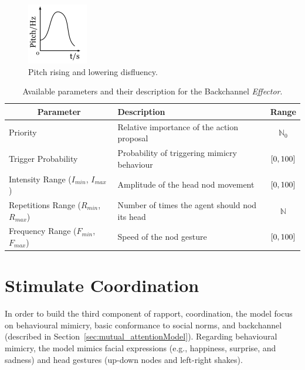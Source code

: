 \begin{figure}[H]
  \hspace{3mm}
  \begin{minipage}[b]{0.5\linewidth}
    \centering
    \includegraphics[width=.35\linewidth]{images/PitchRisingLowering.png} 
    \caption{Pitch rising and lowering disfluency.} 
    \label{fig:risingLowering}
    \vspace{4ex}
  \end{minipage} 
\end{figure}

\begin{table}[H]
	\centering
	\begin{tabular}{|l|l|c|}
	\hline
	\multicolumn{1}{|c|}{\textbf{Parameter}} & \textbf{Description} & \textbf{Range} \\ \hline
		Priority & Relative importance of the action proposal & $\mathbb{N}_0$ \\ \hline
		Trigger Probability & Probability of triggering mimicry behaviour & $\interval{0}{100}$ \\ \hline
		Intensity Range ($I_{min}$, $I_{max}$) & Amplitude of the head nod movement & $\interval{0}{100}$ \\ \hline
		Repetitions Range ($R_{min}$, $R_{max}$) & Number of times the agent should nod its head & $\mathbb{N}$\\ \hline
		Frequency Range ($F_{min}$, $F_{max}$) & Speed of the nod gesture & $\interval{0}{100}$ \\ \hline				
	\end{tabular}
	\caption{Available parameters and their description for the Backchannel \textit{Effector}.}
	\label{table:backchannel}
\end{table}

\section{Stimulate Coordination}
\label{sub:model_Coordination}

In order to build the third component of rapport, coordination, the model focus on behavioural mimicry, basic conformance to social norms, and backchannel (described in Section~\ref{sec:mutual_attentionModel}). Regarding behavioural mimicry, the model mimics facial expressions (e.g., happiness, surprise, and sadness) and head gestures (up-down nodes and left-right shakes).

